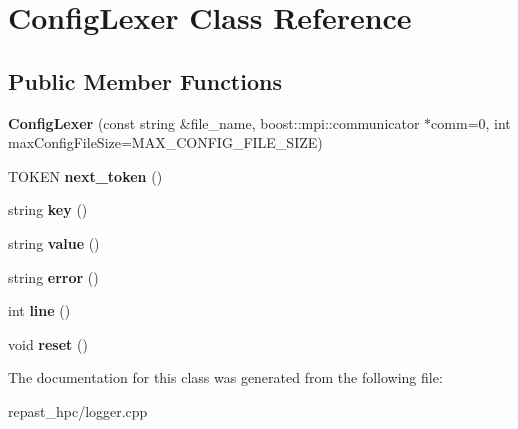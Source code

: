 \hypertarget{class_config_lexer}{\section{Config\-Lexer Class Reference}
\label{class_config_lexer}
}
\subsection*{Public Member Functions}
\begin{DoxyCompactItemize}
\item 
\hypertarget{class_config_lexer_a046cf2dcd1d747298665437b8b21ef11}{{\bfseries Config\-Lexer} (const string \&file\-\_\-name, boost\-::mpi\-::communicator $\ast$comm=0, int max\-Config\-File\-Size=M\-A\-X\-\_\-\-C\-O\-N\-F\-I\-G\-\_\-\-F\-I\-L\-E\-\_\-\-S\-I\-Z\-E)}\label{class_config_lexer_a046cf2dcd1d747298665437b8b21ef11}

\item 
\hypertarget{class_config_lexer_ac6c1e251c3db1f30c50b20b1ee7450f1}{T\-O\-K\-E\-N {\bfseries next\-\_\-token} ()}\label{class_config_lexer_ac6c1e251c3db1f30c50b20b1ee7450f1}

\item 
\hypertarget{class_config_lexer_adc9e9967c636a264708b3bf06aaf3a76}{string {\bfseries key} ()}\label{class_config_lexer_adc9e9967c636a264708b3bf06aaf3a76}

\item 
\hypertarget{class_config_lexer_abd3e04c84b9411f4232a2063fabdb6ac}{string {\bfseries value} ()}\label{class_config_lexer_abd3e04c84b9411f4232a2063fabdb6ac}

\item 
\hypertarget{class_config_lexer_a483c74b57e0ec56abdb815dc91511c51}{string {\bfseries error} ()}\label{class_config_lexer_a483c74b57e0ec56abdb815dc91511c51}

\item 
\hypertarget{class_config_lexer_adfa7ec76d67765cd52ff3c91af5f9dbd}{int {\bfseries line} ()}\label{class_config_lexer_adfa7ec76d67765cd52ff3c91af5f9dbd}

\item 
\hypertarget{class_config_lexer_a3f6909108d4b8f09b12f1c9332fc9930}{void {\bfseries reset} ()}\label{class_config_lexer_a3f6909108d4b8f09b12f1c9332fc9930}

\end{DoxyCompactItemize}


The documentation for this class was generated from the following file\-:\begin{DoxyCompactItemize}
\item 
repast\-\_\-hpc/logger.\-cpp\end{DoxyCompactItemize}
